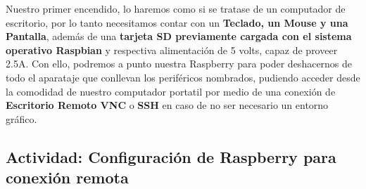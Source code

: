 \documentclass[letterpaper, 10pt]{report}
\begin{document}
Nuestro primer encendido, lo haremos como si se tratase de un computador de escritorio, por lo tanto necesitamos contar con un \textbf{Teclado, un Mouse y una Pantalla}, además de una \textbf{tarjeta SD previamente cargada con el sistema operativo Raspbian} y respectiva alimentación de 5 volts, capaz de proveer 2.5A. Con ello, podremos a punto nuestra Raspberry para poder deshacernos de todo el aparataje que conllevan los periféricos nombrados, pudiendo acceder desde la comodidad de nuestro computador portatil por medio de una conexión de \textbf{Escritorio Remoto VNC} o \textbf{SSH} en caso de no ser necesario un entorno gráfico. 

\subsection{Actividad: Configuración de Raspberry para conexión remota}
\end{document}
